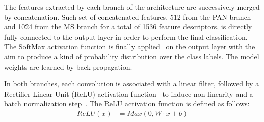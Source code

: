 \documentclass[journal]{IEEEtran}
\newcommand{\disc}[1]{$\Rightarrow$\textbf{TO-FIX: \textit{#1}}$\Leftarrow$}
\begin{document}

The features extracted by each branch of the architecture are successively merged by concatenation. Such set of concatenated features, 512 from the PAN branch and 1024 from the MS branch for a total of 1536 feature descriptors, is directly fully connected to the output layer in order to perform the final classification. The SoftMax activation function is finally applied~\cite{Zhang16} on the output layer with the aim to produce a kind of probability distribution over the class labels. The model weights are learned by back-propagation.


In both branches, each convolution is associated with a linear filter, followed by a Rectifier Linear Unit (ReLU) activation function~\cite{NairH10} to induce non-linearity and a batch normalization step~\cite{IoffeS15}. The ReLU activation function is defined as follows:
\begin{align}
ReLU(x) &= Max(0, W \cdot x + b) \label{eqn:relu}
\end{align}
\end{document}
